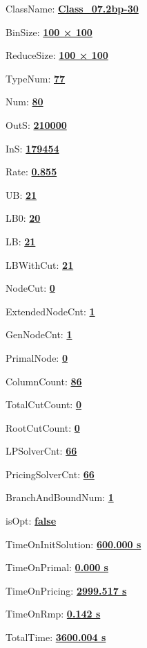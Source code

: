\documentclass[11pt]{article}
\begin{document}
\pagestyle{empty}


ClassName: \underline{\textbf{Class_07.2bp-30}}
\par
BinSize: \underline{\textbf{100 × 100}}
\par
ReduceSize: \underline{\textbf{100 × 100}}
\par
TypeNum: \underline{\textbf{77}}
\par
Num: \underline{\textbf{80}}
\par
OutS: \underline{\textbf{210000}}
\par
InS: \underline{\textbf{179454}}
\par
Rate: \underline{\textbf{0.855}}
\par
UB: \underline{\textbf{21}}
\par
LB0: \underline{\textbf{20}}
\par
LB: \underline{\textbf{21}}
\par
LBWithCut: \underline{\textbf{21}}
\par
NodeCut: \underline{\textbf{0}}
\par
ExtendedNodeCnt: \underline{\textbf{1}}
\par
GenNodeCnt: \underline{\textbf{1}}
\par
PrimalNode: \underline{\textbf{0}}
\par
ColumnCount: \underline{\textbf{86}}
\par
TotalCutCount: \underline{\textbf{0}}
\par
RootCutCount: \underline{\textbf{0}}
\par
LPSolverCnt: \underline{\textbf{66}}
\par
PricingSolverCnt: \underline{\textbf{66}}
\par
BranchAndBoundNum: \underline{\textbf{1}}
\par
isOpt: \underline{\textbf{false}}
\par
TimeOnInitSolution: \underline{\textbf{600.000 s}}
\par
TimeOnPrimal: \underline{\textbf{0.000 s}}
\par
TimeOnPricing: \underline{\textbf{2999.517 s}}
\par
TimeOnRmp: \underline{\textbf{0.142 s}}
\par
TotalTime: \underline{\textbf{3600.004 s}}
\par
\newpage


\end{document}

